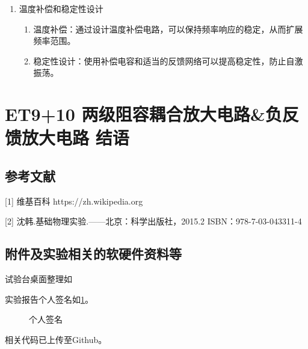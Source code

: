 \documentclass[dvipsnames, svgnames,a4paper,11pt]{article}
\begin{document}
\begin{enumerate}
\begin{enumerate}
				\item 温度补偿和稳定性设计
				\begin{enumerate}
					\item 温度补偿：通过设计温度补偿电路，可以保持频率响应的稳定，从而扩展频率范围。
					\item 稳定性设计：使用补偿电容和适当的反馈网络可以提高稳定性，防止自激振荡。
				\end{enumerate}
			\end{enumerate}
		\end{enumerate}


		
	
		
	
	
	
	\clearpage
	
	\section{ET9+10 \quad 两级阻容耦合放大电路\&负反馈放大电路 \quad\heiti 结语}
	
	
	\subsection{参考文献}
	[1] 维基百科 https://zh.wikipedia.org
	
	[2] 沈韩.基础物理实验.——北京：科学出版社，2015.2 ISBN：978-7-03-043311-4
	
	
	\subsection{附件及实验相关的软硬件资料等}
	试验台桌面整理如%
	
	实验报告个人签名如\cref{fig:name}。
	
	\begin{figure}[htbp]
		\centering
		\caption{个人签名}
		\label{fig:name}			
	\end{figure}
	
	
	相关代码已上传至Github。
	
	
	
\end{document}
